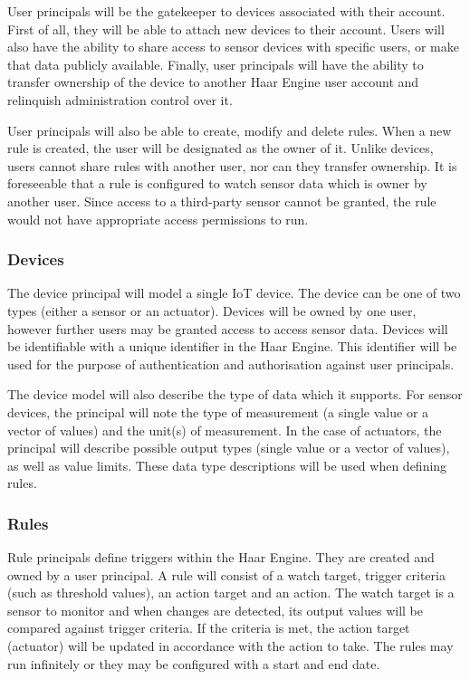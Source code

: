         User principals will be the gatekeeper to devices associated with their account. First of all, they will be able to attach new devices to their account. Users will also have the ability to share access to sensor devices with specific users, or make that data publicly available. Finally, user principals will have the ability to transfer ownership of the device to another Haar Engine user account and relinquish administration control over it.

        User principals will also be able to create, modify and delete rules. When a new rule is created, the user will be designated as the owner of it. Unlike devices, users cannot share rules with another user, nor can they transfer ownership. It is foreseeable that a rule is configured to watch sensor data which is owner by another user. Since access to a third-party sensor cannot be granted, the rule would not have appropriate access permissions to run.

      \subsubsection{Devices}
        The device principal will model a single IoT device. The device can be one of two types (either a sensor or an actuator). Devices will be owned by one user, however further users may be granted access to access sensor data. Devices will be identifiable with a unique identifier in the Haar Engine. This identifier will be used for the purpose of authentication and authorisation against user principals.

        The device model will also describe the type of data which it supports. For sensor devices, the principal will note the type of measurement (a single value or a vector of values) and the unit(s) of measurement. In the case of actuators, the principal will describe possible output types (single value or a vector of values), as well as value limits. These data type descriptions will be used when defining rules.

      \subsubsection{Rules}
        Rule principals define triggers within the Haar Engine. They are created and owned by a user principal. A rule will consist of a watch target, trigger criteria (such as threshold values), an action target and an action. The watch target is a sensor to monitor and when changes are detected, its output values will be compared against trigger criteria. If the criteria is met, the action target (actuator) will be updated in accordance with the action to take. The rules may run infinitely or they may be configured with a start and end date.

